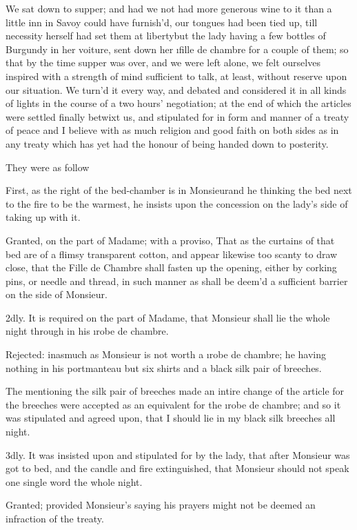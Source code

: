 \documentclass[twoside]{article}
\begin{document}
We sat down to supper; and had we not had
more generous wine to it than a little inn
in Savoy could have furnish’d, our tongues
had been tied up, till necessity herself
had set them at liberty\tskk but the lady
having a few bottles of Burgundy in her
voiture, sent down her \i{fille de
chambre} for a couple of them; so that by
the time supper was over, and we were left
alone, we felt ourselves inspired with a
strength of mind sufficient to talk, at
least, without reserve upon our situation.
We turn’d it every way, and debated and
considered it in all kinds of lights in
the course of a two hours’ negotiation; at
the end of which the articles were settled
finally betwixt us, and stipulated for in
form and manner of a treaty of peace\tskk
and I believe with as much religion and
good faith on both sides as in any treaty
which has yet had the honour of being
handed down to posterity.

They were as follow\tskk 

First, as the right of the bed-chamber is
in Monsieur\tskk and he thinking the bed
next to the fire to be the warmest, he
insists upon the concession on the lady’s
side of taking up with it.

Granted, on the part of Madame; with a
proviso, That as the curtains of that bed
are of a flimsy transparent cotton, and
appear likewise too scanty to draw close,
that the Fille de Chambre shall fasten
up the opening, either by corking pins, or
needle and thread, in such manner as shall
be deem’d a sufficient barrier on the side
of Monsieur.

2dly.  It is required on the part of
Madame, that Monsieur shall lie the whole
night through in his \i{robe de chambre}.

Rejected: inasmuch as Monsieur is not
worth a \i{robe de chambre}; he having
nothing in his portmanteau but six shirts
and a black silk pair of breeches.

The mentioning the silk pair of breeches
made an intire change of the article\tskk
for the breeches were accepted as an
equivalent for the \i{robe de chambre};
and so it was stipulated and agreed upon,
that I should lie in my black silk
breeches all night.

3dly.  It was insisted upon and stipulated
for by the lady, that after Monsieur was
got to bed, and the candle and fire
extinguished, that Monsieur should not
speak one single word the whole night.

Granted; provided Monsieur’s saying his
prayers might not be deemed an infraction
of the treaty.
\end{document}
